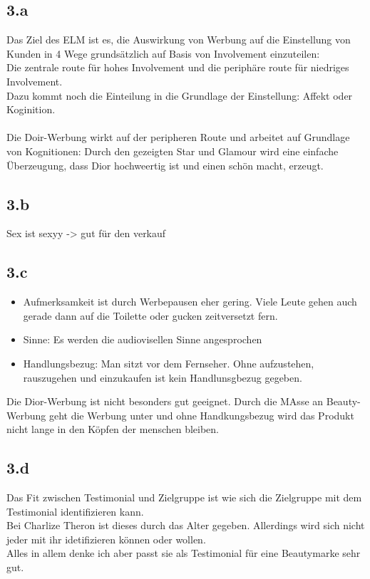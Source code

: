 \subsection{3.a}
    Das Ziel des ELM ist es, die Auswirkung von Werbung auf die Einstellung von Kunden in 4 Wege grundsätzlich auf Basis von Involvement einzuteilen: \\
    Die zentrale route für hohes Involvement und die periphäre route für niedriges Involvement. \\
    Dazu kommt noch die Einteilung in die Grundlage der Einstellung: Affekt oder Koginition. \\
    \ \\
    Die Doir-Werbung wirkt auf der peripheren Route und arbeitet auf Grundlage von Kognitionen: Durch den gezeigten Star und Glamour wird eine einfache Überzeugung, dass Dior hochweertig ist und einen schön macht, erzeugt. \\

\subsection{3.b}
    Sex ist sexyy -> gut für den verkauf

\subsection{3.c}
    \begin{itemize}
        \item Aufmerksamkeit ist durch Werbepausen eher gering. Viele Leute gehen auch gerade dann auf die Toilette oder gucken zeitversetzt fern.
        \item Sinne: Es werden die audiovisellen Sinne angesprochen
        \item Handlungsbezug: Man sitzt vor dem Fernseher. Ohne aufzustehen, rauszugehen und einzukaufen ist kein Handlunsgbezug gegeben.
    \end{itemize}

    Die Dior-Werbung ist nicht besonders gut geeignet. Durch die MAsse an Beauty-Werbung geht die Werbung unter und ohne Handkungsbezug wird das Produkt nicht lange in den Köpfen der menschen bleiben.

\subsection{3.d}
    Das Fit zwischen Testimonial und Zielgruppe ist wie sich die Zielgruppe mit dem Testimonial identifizieren kann. \\
    Bei Charlize Theron ist dieses durch das Alter gegeben. Allerdings wird sich nicht jeder mit ihr idetifizieren können oder wollen. \\
    Alles in allem denke ich aber passt sie als Testimonial für eine Beautymarke sehr gut.


